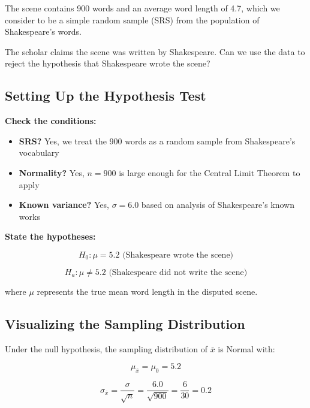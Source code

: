 \documentclass[
  letterpaper,
  DIV=11,
  numbers=noendperiod]{scrreprt}
\providecommand{\tightlist}{%
  \setlength{\itemsep}{0pt}\setlength{\parskip}{0pt}}
\begin{document}
The scene contains 900 words and an average word length of 4.7, which we
consider to be a simple random sample (SRS) from the population of
Shakespeare's words.

The scholar claims the scene was written by Shakespeare. Can we use the
data to reject the hypothesis that Shakespeare wrote the scene?

\subsection{Setting Up the Hypothesis
Test}\label{setting-up-the-hypothesis-test}

\textbf{Check the conditions:}

\begin{itemize}
\tightlist
\item
  \textbf{SRS?} Yes, we treat the 900 words as a random sample from
  Shakespeare's vocabulary
\item
  \textbf{Normality?} Yes, \(n = 900\) is large enough for the Central
  Limit Theorem to apply
\item
  \textbf{Known variance?} Yes, \(\sigma = 6.0\) based on analysis of
  Shakespeare's known works
\end{itemize}

\textbf{State the hypotheses:}

\[
H_0: \mu = 5.2 \text{ (Shakespeare wrote the scene)}
\]

\[
H_a: \mu \neq 5.2 \text{ (Shakespeare did not write the scene)}
\]

where \(\mu\) represents the true mean word length in the disputed
scene.

\subsection{Visualizing the Sampling
Distribution}\label{visualizing-the-sampling-distribution}

Under the null hypothesis, the sampling distribution of \(\bar{x}\) is
Normal with:

\[
\mu_{\bar{x}} = \mu_0 = 5.2
\]

\[
\sigma_{\bar{x}} = \frac{\sigma}{\sqrt{n}} = \frac{6.0}{\sqrt{900}} = \frac{6}{30} = 0.2
\]
\end{document}
